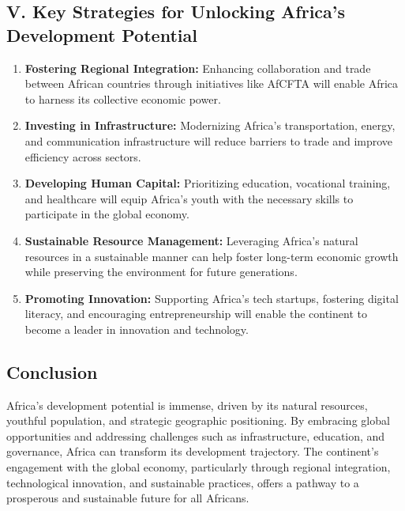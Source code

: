 \documentclass[10pt]{article}
\begin{document}
\subsection*{V. Key Strategies for Unlocking Africa's Development Potential}
\begin{enumerate}
  \item \textbf{Fostering Regional Integration:} Enhancing collaboration and trade between African
    countries through initiatives like AfCFTA will enable Africa to harness its collective
    economic power.

  \item \textbf{Investing in Infrastructure:} Modernizing Africa's transportation, energy, and
    communication infrastructure will reduce barriers to trade and improve efficiency across
    sectors.

  \item \textbf{Developing Human Capital:} Prioritizing education, vocational training, and healthcare
    will equip Africa's youth with the necessary skills to participate in the global economy.

  \item \textbf{Sustainable Resource Management:} Leveraging Africa's natural resources in a
    sustainable manner can help foster long-term economic growth while preserving the
    environment for future generations.

  \item \textbf{Promoting Innovation:} Supporting Africa's tech startups, fostering digital literacy, and
    encouraging entrepreneurship will enable the continent to become a leader in
    innovation and technology.
\end{enumerate}

\subsection*{Conclusion}
Africa's development potential is immense, driven by its natural resources, youthful population,
and strategic geographic positioning. By embracing global opportunities and addressing
challenges such as infrastructure, education, and governance, Africa can transform its
development trajectory. The continent's engagement with the global economy, particularly
through regional integration, technological innovation, and sustainable practices, offers a
pathway to a prosperous and sustainable future for all Africans.
\end{document}
